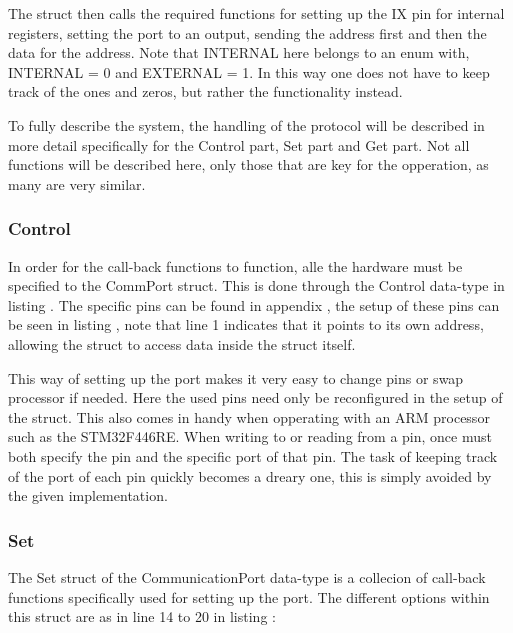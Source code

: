 The struct then calls the required functions for setting up the IX pin for internal registers, setting the port to an output, sending the address first and then the data for the address. Note that INTERNAL here belongs to an enum with, INTERNAL = 0 and EXTERNAL = 1. In this way one does not have to keep track of the ones and zeros, but rather the functionality instead.

To fully describe the system, the handling of the protocol will be described in more detail specifically for the Control part, Set part and Get part. Not all functions will be described here, only those that are key for the opperation, as many are very similar.

\subsubsection{Control}
In order for the call-back functions to function, alle the hardware must be specified to the CommPort struct. This is done through the Control data-type in listing . The specific pins can be found in appendix , the setup of these pins can be seen in listing , note that line 1 indicates that it points to its own address, allowing the struct to access data inside the struct itself.



This way of setting up the port makes it very easy to change pins or swap processor if needed. Here the used pins need only be reconfigured in the setup of the struct. This also comes in handy when opperating with an ARM processor such as the STM32F446RE. When writing to or reading from a pin, once must both specify the pin and the specific port of that pin. The task of keeping track of the port of each pin quickly becomes a dreary one, this is simply avoided by the given implementation.

\subsubsection{Set}
The Set struct of the CommunicationPort data-type is a collecion of call-back functions specifically used for setting up the port. The different options within this struct are as in line 14 to 20 in listing :

